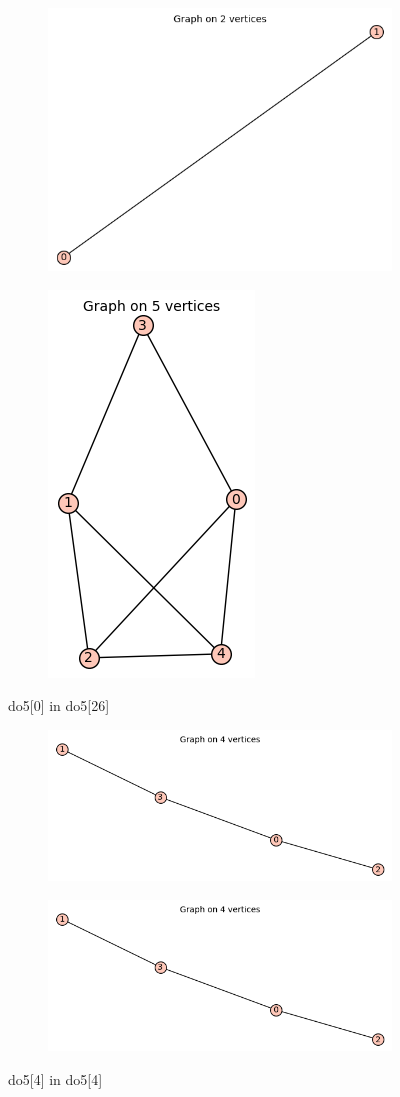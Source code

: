 \documentclass[12pt, a4paper]{article}
\begin{document}
\begin{center}
\begin{figure}
\centering
\begin{subfigure}{0.5\textwidth}
  \centering
  \includegraphics[width=0.5\linewidth]{do5[0]}
\end{subfigure}%
\begin{subfigure}{0.5\textwidth}
  \centering
  \includegraphics[width=0.35\linewidth]{do5[26]}
\end{subfigure}
\caption{do5[0] in do5[26]}
\label{fig:test}
\end{figure}

\begin{figure}
\centering
\begin{subfigure}{0.5\textwidth}
  \centering
  \includegraphics[width=0.6\linewidth]{do5[4]}
\end{subfigure}%
\begin{subfigure}{0.5\textwidth}
  \centering
  \includegraphics[width=0.6\linewidth]{do5[4]}
\end{subfigure}
\caption{do5[4] in do5[4]}
\label{fig:test}
\end{figure}


\end{center}
\end{document}
